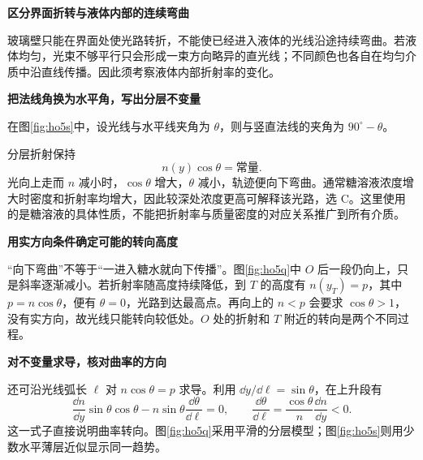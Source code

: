 \begin{solution}\textbf{区分界面折转与液体内部的连续弯曲}\par\nobreak
玻璃壁只能在界面处使光路转折，不能使已经进入液体的光线沿途持续弯曲。若液体均匀，光束不够平行只会形成一束方向略异的直光线；不同颜色也各自在均匀介质中沿直线传播。因此须考察液体内部折射率的变化。



\par\medskip{}\noindent\textbf{把法线角换为水平角，写出分层不变量}\par\nobreak
在图\ref{fig:ho5s}中，设光线与水平线夹角为 $\theta$，则与竖直法线的夹角为 $90^\circ-\theta$。

分层折射保持
\[
n(y)\cos\theta=\text{常量}.
\]
光向上走而 $n$ 减小时，$\cos\theta$ 增大，$\theta$ 减小，轨迹便向下弯曲。通常糖溶液浓度增大时密度和折射率均增大，因此较深处浓度更高可解释该光路，选 $\boxed{\mathrm C}$。这里使用的是糖溶液的具体性质，不能把折射率与质量密度的对应关系推广到所有介质。



\par\medskip{}\noindent\textbf{用实方向条件确定可能的转向高度}\par\nobreak
“向下弯曲”不等于“一进入糖水就向下传播”。图\ref{fig:ho5q}中 $O$ 后一段仍向上，只是斜率逐渐减小。若折射率随高度持续降低，到 $T$ 的高度有 $n(y_T)=p$，其中 $p=n\cos\theta$，便有 $\theta=0$，光路到达最高点。再向上的 $n<p$ 会要求 $\cos\theta>1$，没有实方向，故光线只能转向较低处。$O$ 处的折射和 $T$ 附近的转向是两个不同过程。



\par\medskip{}\noindent\textbf{对不变量求导，核对曲率的方向}\par\nobreak
还可沿光线弧长 $\ell$ 对 $n\cos\theta=p$ 求导。利用 $\dd y/\dd\ell=\sin\theta$，在上升段有
\[
\frac{\dd n}{\dd y}\sin\theta\cos\theta
-n\sin\theta\frac{\dd\theta}{\dd\ell}=0,
\qquad
\frac{\dd\theta}{\dd\ell}=\frac{\cos\theta}{n}\frac{\dd n}{\dd y}<0.
\]
这一式子直接说明曲率转向。图\ref{fig:ho5q}采用平滑的分层模型；图\ref{fig:ho5s}则用少数水平薄层近似显示同一趋势。
\end{solution}

